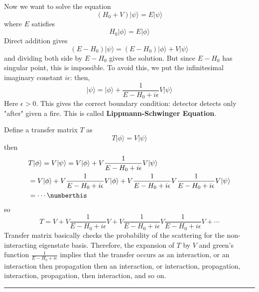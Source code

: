 Now we want to solve the equation
\begin{equation}
(H_0+V)|\psi\rangle =E|\psi\rangle
\end{equation}
where $E$ satisfies
\begin{equation}
H_0|\phi\rangle=E|\phi\rangle
\end{equation}
Direct addition gives
\begin{equation}
(E-H_0)|\psi\rangle = (E-H_0)|\phi\rangle +V|\psi\rangle
\end{equation}
and dividing both side by $E-H_0$ gives the solution. But since $E-H_0$ has singular point, this is impossible. To avoid this, we put the infinitesimal imaginary constant $i\epsilon$: then,
\begin{equation}
|\psi\rangle = |\phi\rangle +\frac{1}{E-H_0+i\epsilon}V|\psi\rangle
\end{equation}
Here $\epsilon>0$. This gives the correct boundary condition: detector detects only "after" given a fire. This is called \textbf{Lippmann-Schwinger Equation}.

Define a transfer matrix $T$ as
\begin{equation}
T|\phi\rangle = V|\psi\rangle
\end{equation}
then
\begin{align*}
&T|\phi\rangle =V|\psi\rangle = V|\phi\rangle+V\frac{1}{E-H_0+i\epsilon}V|\psi\rangle\\
&=V|\phi\rangle + V\frac{1}{E-H_0+i\epsilon}V|\phi\rangle + V\frac{1}{E-H_0+i\epsilon}V\frac{1}{E-H_0+i\epsilon}V|\psi\rangle\\
&=\cdots\numberthis
\end{align*}
so
\begin{equation}
T=V+V\frac{1}{E-H_0+i\epsilon}V+V\frac{1}{E-H_0+i\epsilon}V\frac{1}{E-H_0+i\epsilon}V+\cdots
\end{equation}
Transfer matrix basically checks the probability of the scattering for the non-interacting eigenstate basis. Therefore, the expansion of $T$ by $V$ and green's function $\frac{1}{E-H_0+i\epsilon}$ implies that the transfer occurs as an interaction, or an interaction then propagation then an interaction, or interaction, propagation, interaction, propagation, then interaction, and so on.

\noindent\rule{\textwidth}{1pt}
\newline
